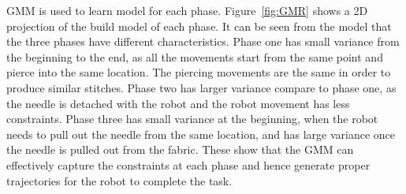 \begin{figure}
\end{figure}

GMM is used to learn model for each phase. Figure~\ref{fig:GMR} shows a 2D projection of the build model of each phase. It can be seen from the model that the three phases have different characteristics. Phase one has small variance from the beginning to the end, as all the movements start from the same point and pierce into the same location. The piercing movements are the same in order to produce similar stitches. Phase two has larger variance compare to phase one, as the needle is detached with the robot and the robot movement has less constraints. Phase three has small variance at the beginning, when the robot needs to pull out the needle from the same location, and has large variance once the needle is pulled out from the fabric. These show that the GMM can effectively capture the constraints at each phase and hence generate proper trajectories for the robot to complete the task.

